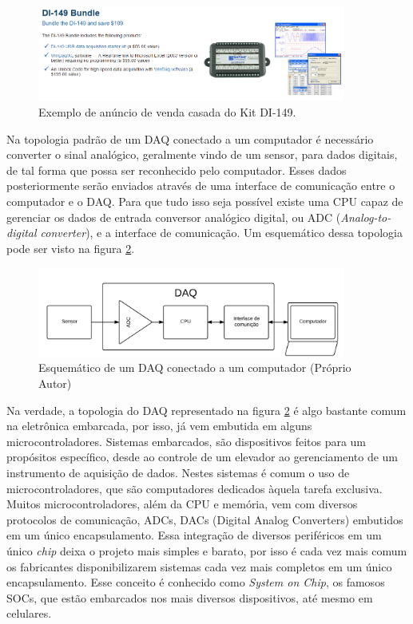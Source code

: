 \begin{figure}
	\centering
	\includegraphics[width=0.9\textwidth]{figuras/bundle.PNG}
	\caption{Exemplo de anúncio de venda casada do Kit DI-149. \cite{dataqcasada}}
	\label{figura:vendacasada}
\end{figure} 

Na topologia padrão de um DAQ conectado a um computador é necessário converter o sinal analógico, geralmente vindo de um sensor, para dados digitais, de tal forma que possa ser reconhecido pelo computador. Esses dados posteriormente serão enviados através de uma interface de comunicação entre o computador e o DAQ. Para que tudo isso seja possível existe uma CPU capaz de gerenciar os dados de entrada conversor analógico digital, ou ADC (\emph{Analog-to-digital converter}), e a interface de comunicação. Um esquemático dessa topologia pode ser visto na figura \ref{figura:esquematico-daq-pc}.

\begin{figure}
	\centering
	\includegraphics[width=0.9\textwidth]{figuras/daq-esquema.png}
	\caption{Esquemático de um DAQ conectado a um computador (Próprio Autor)}
	\label{figura:esquematico-daq-pc}
\end{figure}

Na verdade, a topologia do DAQ representado na figura \ref{figura:esquematico-daq-pc} é algo bastante comum na eletrônica embarcada, por isso, já vem embutida em alguns microcontroladores. Sistemas embarcados, são dispositivos feitos para um propósitos específico, desde ao controle de um elevador ao gerenciamento de um instrumento de aquisição de dados. Nestes sistemas é comum o uso de microcontroladores, que são computadores dedicados àquela tarefa exclusiva. Muitos microcontroladores, além da CPU e memória, vem com diversos protocolos de comunicação, ADCs, DACs (Digital Analog Converters) embutidos em um único encapsulamento. Essa integração de diversos periféricos em um único \emph{chip} deixa o projeto mais simples e barato, por isso é cada vez mais comum os fabricantes disponibilizarem sistemas cada vez mais completos em um único encapsulamento. Esse conceito é conhecido como \emph{System on Chip}, os famosos SOCs, que estão embarcados nos mais diversos dispositivos, até mesmo em celulares.

